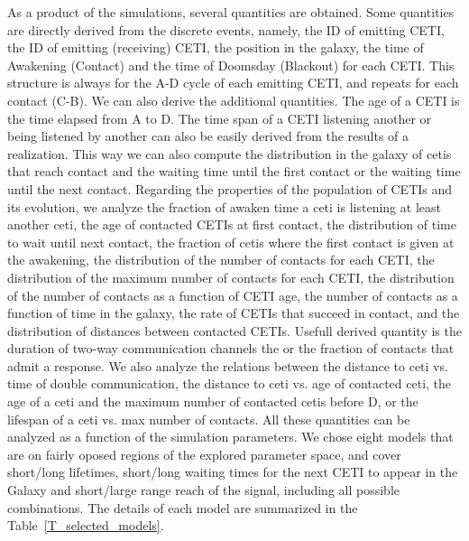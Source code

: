 \documentclass[crop]{CSLB}%
\begin{document}
As a product of the simulations, several quantities are obtained.
%
Some quantities are directly derived from the discrete events, namely,
the ID of emitting CETI, the ID of emitting (receiving) CETI, the
position in the galaxy, the time of Awakening (Contact) and the time
of Doomsday  (Blackout) for each CETI.
%
This structure is always for the A-D cycle of each emitting CETI, and
repeats for each contact (C-B).
%
We can also derive the additional quantities.
%
The age of a CETI is the time elapsed from A to D.
%
%
%
The time span of a CETI listening another or being listened by another
can also be easily derived from the results of a realization.
%
This way we can also compute the distribution in the galaxy of cetis
that reach contact and the waiting time until the first contact or the
waiting time until the next contact.
%
Regarding the properties of the population of CETIs and its evolution,
we analyze the fraction of awaken time a ceti is listening at least
another ceti, the age of contacted CETIs at first contact, the
distribution of time to wait until next contact, the fraction of cetis
where the first contact is given at the awakening, the distribution of
the number of contacts for each CETI, the distribution of the maximum
number of contacts for each CETI, the distribution of the number of
contacts as a function of CETI age, the number of contacts as a
function of time in the galaxy, the rate of CETIs that succeed in
contact, and the distribution of distances between contacted CETIs.
%
Usefull derived quantity is the duration of two-way communication
channels the or the fraction of contacts that admit a response.
% 
We also analyze the relations between the distance to ceti vs. time of
double communication, the distance to ceti vs. age of contacted ceti,
the age of a ceti and the maximum number of contacted cetis before D,
or the lifespan of a ceti vs. max number of contacts.
%
All these quantities can be analyzed as a function of the simulation
parameters.
%
We chose eight models that are on fairly oposed regions of the
explored parameter space, and cover short/long lifetimes, short/long
waiting times for the next CETI to appear in the Galaxy and
short/large range reach of the signal, including all possible
combinations.
%
The details of each model are summarized in the
Table~\ref{T_selected_models}.
\end{document}
